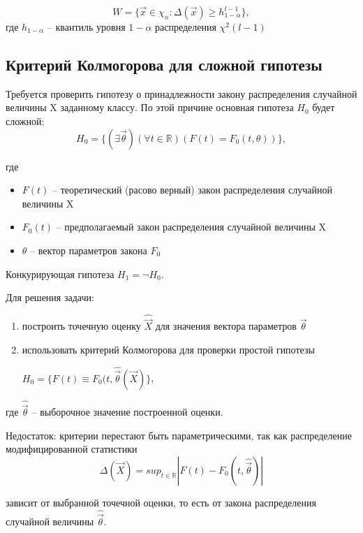 \documentclass[a4paper, 12pt]{article}
\theoremstyle{definition}
\theoremstyle{leads}
\theoremstyle{example}
\theoremstyle{remark}
\begin{document}
\begin{equation*}
	W = \{ \vec{x} \in \chi_n : \Delta(\vec{x}) \geq h_{1 - \alpha}^{l - 1} \},
\end{equation*}
где $h_{1 - \alpha}$ -- квантиль уровня $1 - \alpha$ распределения $\chi^2 (l - 1)$


\subsection{Критерий Колмогорова для сложной гипотезы}

Требуется проверить гипотезу о принадлежности закону распределения случайной величины X заданному классу. По этой причине основная гипотеза $H_0$ будет сложной: 
\begin{equation*}
	H_0 = \{ (\exists \vec{\theta}) (\forall t \in \mathbb{R}) (F(t) = F_0(t, \theta)) \},
\end{equation*}

где 
\begin{itemize}
	\item $F(t)$ -- теоретический (расово верный) закон распределения случайной величины X
	\item $F_0(t)$ -- предполагаемый закон распределения случайной величины X
	\item $\theta$ -- вектор параметров закона $F_0$
\end{itemize}

Конкурирующая гипотеза $H_1 = \neg H_0$.

Для решения задачи:

\begin{enumerate}
	\item построить точечную оценку $\hat{\vec{X}}$ для значения вектора параметров $\vec{\theta}$
	\item использовать критерий Колмогорова для проверки простой гипотезы 
	
	$H_0 = \{ F(t) \equiv F_0(t, \hat{\vec{\theta}}(\vec{X})\}$,
\end{enumerate}

где $\hat{\vec{\theta}}$ -- выборочное значение построенной оценки.

Недостаток: критерии перестают быть параметрическими, так как распределение модифицированной статистики 
\begin{equation*}
	\Delta(\vec{X}) = sup_{t \in \mathbb{R}} |F(t) - F_0(t, \hat{\vec{\theta}})|
\end{equation*}

зависит от выбранной точечной оценки, то есть от закона распределения случайной величины $\hat{\vec{\theta}}$.
\end{document}
